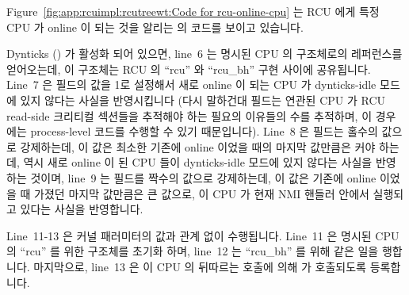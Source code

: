 Figure~\ref{fig:app:rcuimpl:rcutreewt:Code for rcu-online-cpu}
는 RCU 에게 특정 CPU 가 online 이 되는 것을 알리는  의
코드를 보이고 있습니다.

Dynticks () 가 활성화 되어 있으면, line~6 는 명시된 CPU 의
 구조체로의 레퍼런스를 얻어오는데, 이 구조체는 RCU 의 ``rcu''
와 ``rcu\_bh'' 구현 사이에 공유됩니다.
Line~7 은  필드의 값을 1로 설정해서 새로 online 이 되는
CPU 가 dynticks-idle 모드에 있지 않다는 사실을 반영시킵니다 (다시 말하건대
 필드는 연관된 CPU 가 RCU read-side 크리티컬 섹션들을
추적해야 하는 필요의 이유들의 수를 추적하며, 이 경우에는 process-level 코드를
수행할 수 있기 때문입니다).
Line~8 은  필드는 홀수의 값으로 강제하는데, 이 값은 최소한
기존에 online 이었을 때의 마지막 값만큼은 커야 하는데, 역시 새로 online 이 된
CPU 들이 dynticks-idle 모드에 있지 않다는 사실을 반영하는 것이며, line~9 는
 필드를 짝수의 값으로 강제하는데, 이 값은 기존에 online
이었을 때 가졌던 마지막 값만큼은 큰 값으로, 이 CPU 가 현재 NMI 핸들러 안에서
실행되고 있다는 사실을 반영합니다.
\iffalse

Figure~\ref{fig:app:rcuimpl:rcutreewt:Code for rcu-online-cpu}
shows the code for \co{rcu_online_cpu()}, which informs RCU that the
specified CPU is coming online.

When dynticks (\co{CONFIG_NO_HZ}) is enabled, line~6 obtains a
reference to the specified CPU's \co{rcu_dynticks} structure, which
is shared between the ``rcu'' and ``rcu\_bh'' implementations of RCU.
Line~7 sets the \co{->dynticks_nesting} field to the value one,
reflecting the fact that a newly onlined CPU is not in dynticks-idle
mode (recall that the \co{->dynticks_nesting} field tracks the
number of reasons that the corresponding CPU needs to be tracked for
RCU read-side critical sections, in this case because it can run
process-level code).
Line~8 forces the \co{->dynticks} field to an odd value that is
at least as large as the last value it had when previously online,
again reflecting the fact that newly onlined CPUs are not in dynticks-idle
mode, and line~9 forces the \co{->dynticks_nmi} field to an even value
that is at least as large as the last value it had when previously
online, reflecting the fact that this CPU is not currently executing
in an NMI handler.
\fi

Line~11-13 은  커널 패러미터의 값과 관계 없이 수행됩니다.
Line~11 은 명시된 CPU 의 ``rcu'' 를 위한  구조체를 초기화 하며,
line~12 는 ``rcu\_bh'' 를 위해 같은 일을 행합니다.
마지막으로, line~13 은 이 CPU 의 뒤따르는  호출에 의해
 가 호출되도록 등록합니다.
\iffalse

